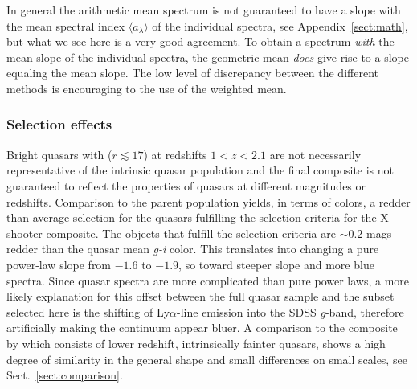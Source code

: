 \documentclass{aa}    %
\newcommand{\sectionname}{Sect.}
\newcommand{\Sect}[1]{\sectionname~\ref{sect:#1}}
\newcommand{\sect}[1]{\Sect{#1}}
\newcommand{\App}[1]{Appendix~\ref{sect:#1}}
\newcommand{\app}[1]{\App{#1}}
\newcommand{\sectlabel}[1]{\label{sect:#1}}
\newcommand{\lya}{Ly$\alpha$}
\begin{document}
In general the arithmetic mean spectrum is not guaranteed to have a
slope with the mean spectral index $\langle a_\lambda\rangle$ of the
individual spectra, see \app{math}, but what we see here is a very
good agreement. To obtain a spectrum \textit{with} the mean slope of
the individual spectra, the geometric mean \textit{does} give rise to
a slope equaling the mean slope. The low level of discrepancy between
the different methods is encouraging to the use of the weighted mean.

\subsubsection{Selection effects}  \sectlabel{Selection effects}
Bright quasars with ($r \lesssim 17$) at redshifts $1 < z < 2.1$ are
not necessarily representative of the intrinsic quasar population
\citep{Paris2014} and the final composite is not guaranteed to reflect
the properties of quasars at different magnitudes or
redshifts. Comparison to the parent population yields, in terms of
colors, a redder than average selection for the quasars fulfilling the
selection criteria for the X-shooter composite. The objects that
fulfill the selection criteria are $\sim 0.2$ mags redder than the
quasar mean \textit{g-i} color. This translates into changing a pure
power-law slope from $-1.6$ to $-1.9$, so toward steeper slope and
more blue spectra. Since quasar spectra are more complicated than pure
power laws, a more likely explanation for this offset between the
full quasar sample and the subset selected here is the shifting of
\lya-line emission into the SDSS \textit{g}-band, therefore artificially making
the continuum appear bluer.  A comparison to the composite by
\citet{VandenBerk2001} which consists of lower redshift, intrinsically
fainter quasars, shows a high degree of similarity in the general
shape and small differences on small scales, see \sect{comparison}.
\end{document}
